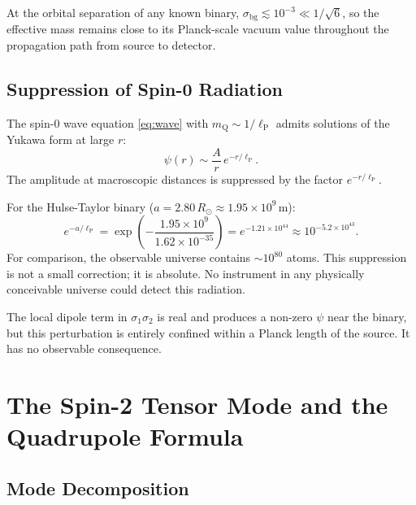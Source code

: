 \documentclass[12pt,a4paper]{article}
\newcommand{\lP}{\ell_{\mathrm{P}}}
\newcommand{\mQ}{m_{\mathrm{Q}}}
\begin{document}
At the orbital separation of any known binary,
$\sigma_\mathrm{bg} \lesssim 10^{-3} \ll 1/\sqrt{6}$, so the effective
mass remains close to its Planck-scale vacuum value throughout the
propagation path from source to detector.

\subsection{Suppression of Spin-0 Radiation}

The spin-0 wave equation \eqref{eq:wave} with $\mQ \sim 1/\lP$ admits
solutions of the Yukawa form at large $r$:
\begin{equation}
  \psi(r) \sim \frac{A}{r}\,e^{-r/\lP}.
\end{equation}
The amplitude at macroscopic distances is suppressed by the factor
$e^{-r/\lP}$.

\begin{result}
For the Hulse-Taylor binary ($a = 2.80\,R_\odot \approx 1.95\times10^9$\,m):
\begin{equation}
  e^{-a/\lP}
  = \exp\!\left(-\frac{1.95\times10^9}{1.62\times10^{-35}}\right)
  = e^{-1.21\times10^{44}}
  \approx 10^{-5.2\times10^{43}}.
\end{equation}
For comparison, the observable universe contains $\sim10^{80}$ atoms.
This suppression is not a small correction; it is absolute.
No instrument in any physically conceivable universe could detect
this radiation.
\end{result}

The local dipole term in $\sigma_1\sigma_2$ is real and produces
a non-zero $\psi$ near the binary, but this perturbation is entirely
confined within a Planck length of the source. It has no observable consequence.

\section{The Spin-2 Tensor Mode and the Quadrupole Formula}

\subsection{Mode Decomposition}
\end{document}
